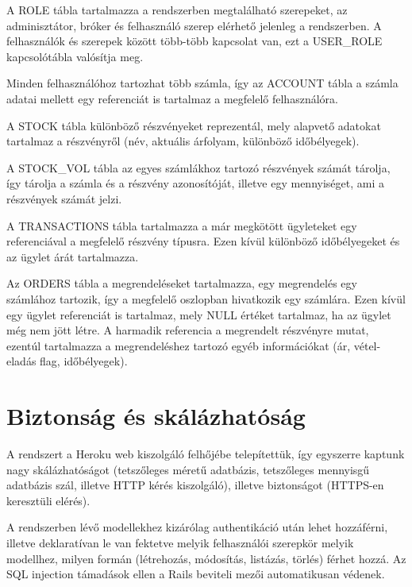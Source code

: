 A ROLE tábla tartalmazza a rendszerben megtalálható szerepeket, az adminisztátor, bróker és felhasználó szerep elérhető jelenleg a rendszerben. A felhasználók és szerepek között több-több kapcsolat van, ezt a USER\_ROLE kapcsolótábla valósítja meg. 

Minden felhasználóhoz tartozhat több számla, így az ACCOUNT tábla a számla adatai mellett egy referenciát is tartalmaz a megfelelő felhasználóra.

A STOCK tábla különböző részvényeket reprezentál, mely alapvető adatokat tartalmaz a részvényről (név, aktuális árfolyam, különböző időbélyegek).

A STOCK\_VOL tábla az egyes számlákhoz tartozó részvények számát tárolja, így tárolja a számla és a részvény azonosítóját, illetve egy mennyiséget, ami a részvények számát jelzi.

A TRANSACTIONS tábla tartalmazza a már megkötött ügyleteket egy referenciával a megfelelő részvény típusra. Ezen kívül különböző időbélyegeket és az ügylet árát tartalmazza.

Az ORDERS tábla a megrendeléseket tartalmazza, egy megrendelés egy számlához tartozik, így a megfelelő oszlopban hivatkozik egy számlára. Ezen kívül egy ügylet referenciát is tartalmaz, mely NULL értéket tartalmaz, ha az ügylet még nem jött létre. A harmadik referencia a megrendelt részvényre mutat, ezentúl tartalmazza a megrendeléshez tartozó egyéb információkat (ár, vétel-eladás flag, időbélyegek).

\section{Biztonság és skálázhatóság}\label{sect:rsz_funkciok}
A rendszert a Heroku web kiszolgáló felhőjébe telepítettük, így egyszerre kaptunk nagy skálázhatóságot (tetszőleges méretű adatbázis, tetszőleges mennyisgű adatbázis szál, illetve HTTP kérés kiszolgáló), illetve biztonságot (HTTPS-en keresztüli elérés).

A rendszerben lévő modellekhez kizárólag authentikáció után lehet hozzáférni, illetve deklaratívan le van fektetve melyik felhasználói szerepkör melyik modellhez, milyen formán (létrehozás, módosítás, listázás, törlés) férhet hozzá. Az SQL injection támadások ellen a Rails beviteli mezői automatikusan védenek.


